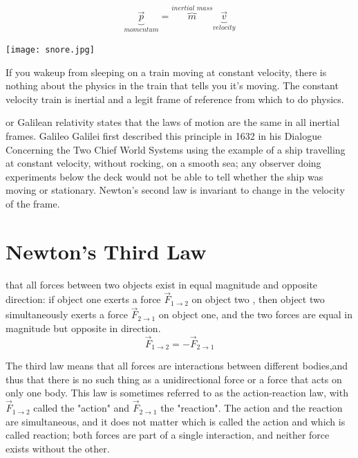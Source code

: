 $$\underbrace{\overrightarrow{p}}_{\textit{momentum}}=\overbrace{m}^{\textit{inertial mass}}\underbrace{\overrightarrow{v}}_{\textit{velocity}}$$

\begin{marginfigure}[40pt]%
  \texttt{[image: snore.jpg]}
  \caption{If you wakeup from sleeping on a train moving at constant velocity, there is nothing about the physics in the train that tells you it's moving.  The constant velocity train is inertial and a legit frame of reference from which to do physics.}
  \label{fig:marginfig}
\end{marginfigure}
 or Galilean relativity states that the laws of motion are the same in all inertial frames. Galileo Galilei first described this principle in 1632 in his Dialogue Concerning the Two Chief World Systems using the example of a ship travelling at constant velocity, without rocking, on a smooth sea; any observer doing experiments below the deck would not be able to tell whether the ship was moving or stationary.  Newton's second law is invariant to change in the velocity of the frame.


\section{Newton's Third Law}
 that all forces between two objects exist in equal magnitude and opposite direction: if object one exerts a force $\overrightarrow{F}_{ 1\rightarrow 2}$ on object two , then object two simultaneously exerts a force $\overrightarrow{F}_{ 2\rightarrow 1}$ on object one, and the two forces are equal in magnitude but opposite in direction.
$$\overrightarrow{F}_{ 1\rightarrow 2}=-\overrightarrow{F}_{2\rightarrow 1}$$

The third law means that all forces are interactions between different bodies,and thus that there is no such thing as a unidirectional force or a force that acts on only one body. This law is sometimes referred to as the action-reaction law, with $\overrightarrow{F}_{ 1\rightarrow 2}$ called the "action" and $\overrightarrow{F}_{ 2\rightarrow 1}$ the "reaction". The action and the reaction are simultaneous, and it does not matter which is called the action and which is called reaction; both forces are part of a single interaction, and neither force exists without the other.

